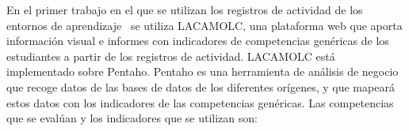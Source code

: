 




En el primer trabajo en el que se utilizan los registros de actividad de los entornos de aprendizaje~\cite{rayon2014web} se utiliza LACAMOLC, una plataforma web que aporta información visual e informes con indicadores de competencias genéricas de los estudiantes a partir de los registros de actividad. LACAMOLC está implementado sobre Pentaho. Pentaho es una herramienta de análisis de negocio que recoge datos de las bases de datos de los diferentes orígenes, y que mapeará estos datos con los indicadores de las competencias genéricas. Las competencias que se evalúan y los indicadores que se utilizan son:


